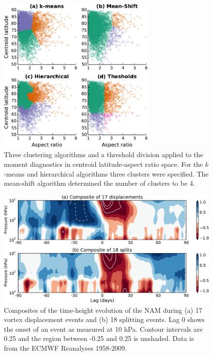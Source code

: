 \begin{figure}
 \centering
 \noindent\includegraphics[width=0.7\textwidth]{figures/chapter-moments/clustering.pdf}
 \caption[Clustering algorithms applied to the moment diagnostics.]{Three
   clustering algorithms and a threshold division applied to the moment
   diagnostics in centroid latitude-aspect ratio space. For the $k$-means and
   hierarchical algorithms three clusters were specified. The mean-shift
   algorithm determined the number of clusters to be 4.}
 \label{fig:clusters}
\end{figure}


\begin{figure}
 \centering
 \noindent\includegraphics[width=\textwidth]{figures/chapter-moments/dripping_paint_crop.pdf}
 \caption[NAM composites for split and displaced vortex events.]{Composites of
   the time-height evolution of the NAM during (a) 17 vortex displacement events
   and (b) 18 splitting events. Lag 0 shows the onset of an event as measured at
   10 hPa. Contour intervals are 0.25 and the region between -0.25 and 0.25 is
   unshaded. Data is from the ECMWF Reanalyses 1958-2009.}
 \label{Fig3}
\end{figure}


